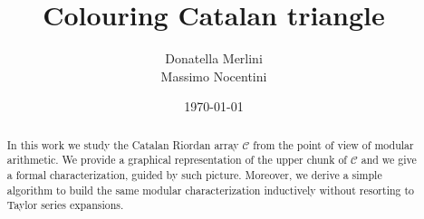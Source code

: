\documentclass[11pt,a4paper]{article} %
\begin{document}

    \title{Colouring Catalan triangle}
    \author{Donatella Merlini\\
            Massimo Nocentini}

    \date{\today} 
    
    \maketitle
    
    \begin{abstract}
        In this work we study the Catalan Riordan array $\mathcal{C}$ from the
        point of view of modular arithmetic. We provide a graphical
        representation of the upper chunk of $\mathcal{C}$ and we give
        a formal characterization, guided by such picture. Moreover, 
        we derive a simple algorithm to build the same modular characterization
        inductively without resorting to Taylor series expansions.
    \end{abstract}
       

    
    
    
    
    

    \newpage
    
    

    \newpage
    
\end{document}
